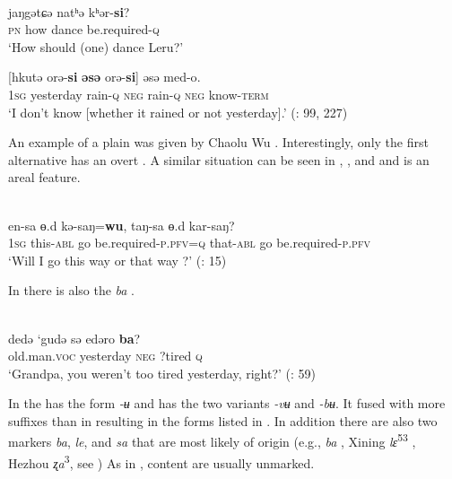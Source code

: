 \ea%
    \label{ex:mong:41}
    \\
    \ea
     {jaŋgətɕə} {natʰə} {kʰər-}\textbf{{si}}?\\
    \textsc{pn}  how    dance  be.required-\textsc{q}\\
    \glt ‘How should (one) dance Leru?’
    
    \ex
     [{hkutə} {or}{ə-}\textbf{{si}} \textbf{{ə}}\textbf{{s}}\textbf{{ə}} {or}{ə-}\textbf{{si}}] {ə}{sə} {med-o}.\\
    1\textsc{sg}  yesterday  rain-\textsc{q}  \textsc{neg}  rain-\textsc{q}  \textsc{neg}  know-\textsc{term}\\
    \glt ‘I don’t know [whether it rained or not yesterday].’ (\citealt{Fried2010}: 99, 227)
    \z
    \z

An example of a plain  was given by Chaolu Wu . Interestingly, only the first alternative has an overt . A similar situation can be seen in , , and  and is an areal feature.

\ea%
    \label{ex:mong:42}
    \\
     en-sa    ɵ.d {kə-}{saŋ=}\textbf{{wu}},    taŋ-sa {ɵ.d} {kar-saŋ?}\\
    1\textsc{sg}  this-\textsc{abl}  go  be.required-\textsc{p.pfv}=\textsc{q}  that-\textsc{abl} go  be.required-\textsc{p.pfv}\\
    \glt ‘Will I go this way or that way ?’ (\citealt{Chaolu1994e}: 15)
    \z

In  there is also the   \textit{ba} .

\ea%
    \label{ex:mong:43}
    \\
    \gll dedə    ‘gudə    sə  edəro \textbf{{ba}}?\\
    old.man.\textsc{voc}  yesterday  \textsc{neg}  ?tired  \textsc{q}\\
    \glt ‘Grandpa, you weren’t too tired yesterday, right?’ (\citealt{Buhe1982}: 59)
    \z

In \textbf{} the  has the form \textit{-ʉ} and has the two variants \textit{-vʉ} and \textit{-bʉ}. It fused with more suffixes than in  resulting in the forms listed in . In addition there are also two markers \textit{ba}, \textit{le}, and \textit{sa} that are most likely of   origin (e.g.,  \textit{ba} , Xining \textit{lɛ}\textsuperscript{53} , Hezhou \textit{ʐa}\textsuperscript{3}, see ) As in , content  are usually unmarked.

